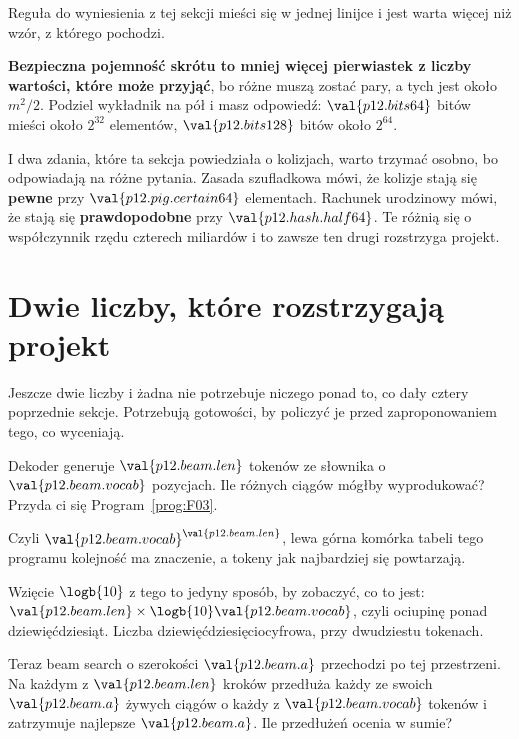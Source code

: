 \begin{fr}
Reguła do wyniesienia z tej sekcji mieści się w jednej linijce i jest warta
więcej niż wzór, z którego pochodzi.

\textbf{Bezpieczna pojemność skrótu to mniej więcej pierwiastek z liczby
wartości, które może przyjąć}, bo różne muszą zostać pary, a tych jest około
$m^{2}/2$. Podziel wykładnik na pół i masz odpowiedź: $\val{p12.bits64}$
bitów mieści około $2^{32}$ elementów, $\val{p12.bits128}$ bitów około
$2^{64}$.

I dwa zdania, które ta sekcja powiedziała o kolizjach, warto trzymać osobno,
bo odpowiadają na różne pytania. Zasada szufladkowa mówi, że kolizje stają się
\textbf{pewne} przy $\val{p12.pig.certain64}$ elementach. Rachunek urodzinowy
mówi, że stają się \textbf{prawdopodobne} przy $\val{p12.hash.half64}$. Te
różnią się o współczynnik rzędu czterech miliardów i to zawsze ten drugi
rozstrzyga projekt.
\end{fr}

\section{Dwie liczby, które rozstrzygają projekt}
\label{sec:P12-designs}

\begin{fr}
Jeszcze dwie liczby i żadna nie potrzebuje niczego ponad to, co dały cztery
poprzednie sekcje. Potrzebują gotowości, by policzyć je przed zaproponowaniem
tego, co wyceniają.

Dekoder generuje $\val{p12.beam.len}$ tokenów ze słownika o
$\val{p12.beam.vocab}$ pozycjach. Ile różnych ciągów mógłby wyprodukować?
Przyda ci się Program~\ref{prog:F03}.
\dotline
\nextframe
\end{fr}

\begin{fr}
Czyli $\val{p12.beam.vocab}^{\val{p12.beam.len}}$, lewa górna komórka tabeli
tego programu \dash{} kolejność ma znaczenie, a tokeny jak najbardziej się
powtarzają.

Wzięcie $\logb{10}$ z tego to jedyny sposób, by zobaczyć, co to jest:
$\val{p12.beam.len} \times \logb{10}\val{p12.beam.vocab}$, czyli ociupinę
ponad dziewięćdziesiąt. Liczba dziewięćdziesięciocyfrowa, przy dwudziestu
tokenach.

Teraz beam search o szerokości $\val{p12.beam.a}$ przechodzi po tej
przestrzeni. Na każdym z $\val{p12.beam.len}$ kroków przedłuża każdy ze swoich
$\val{p12.beam.a}$ żywych ciągów o każdy z $\val{p12.beam.vocab}$ tokenów i
zatrzymuje najlepsze $\val{p12.beam.a}$. Ile przedłużeń ocenia w sumie?
\nextframe
\end{fr}

